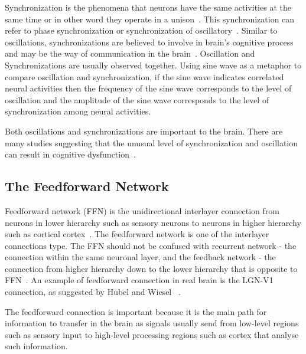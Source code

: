 Synchronization is the phenomena that neurons have the same activities at the same time or in other word they operate in a unison~\cite{ward2003synchronous}. This synchronization can refer to phase synchronization or synchronization of oscillatory~\cite{varela2001brainweb, gray1996chattering, salinas2001correlated}.  Similar to oscillations, synchronizations are believed to involve in brain's cognitive process and may be the way of communication in the brain~\cite{ward2003synchronous, fries2001modulation, engel2001dynamic, womelsdorf2007modulation}. Oscillation and Synchronizations are usually observed together. Using sine wave as a metaphor to compare oscillation and synchronization, if the sine wave indicates correlated neural activities then the frequency of the sine wave corresponds to the level of oscillation and the amplitude of the sine wave corresponds to the level of synchronization among neural activities.

Both oscillations and synchronizations are important to the brain. There are many studies suggesting that the unusual level of synchronization and oscillation can result in cognitive dysfunction~\cite{uhlhaas2010abnormal, grice2001disordered, hammond2007pathological,dinstein2011disrupted, uhlhaas2006neural, schnitzler2005normal, bacsar2008review}.



\subsection{The Feedforward Network}

Feedforward network (FFN) is the unidirectional interlayer connection from neurons in lower hierarchy such as sensory neurons to neurons in higher hierarchy such as cortical cortex~\cite{felleman1991distributed, kumar2010spiking}.
The feedforward network is one of the interlayer connections type. The FFN should not be confused with recurrent network - the connection within the same neuronal layer, and the feedback network - the connection from higher hierarchy down to the lower hierarchy that is opposite to FFN~\cite{carnevale2006neuron, Bower2003Genesis, Kandel5thEdition}. 
An example of feedforward connection in real brain is the LGN-V1 connection, as suggested by Hubel and Wiesel ~\cite{hubel1962receptive}.

The feedforward connection is important because it is the main path for information to transfer in the brain as signals usually send from low-level regions such as sensory input to high-level processing regions such as cortex that analyse such information. 

